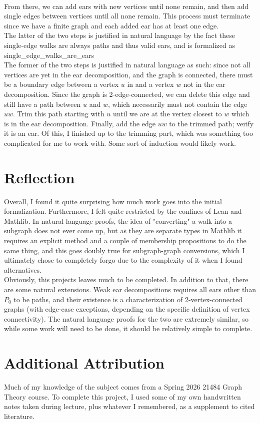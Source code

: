 \documentclass{article}
\begin{document}
\\ From there, we can add ears with new vertices until none remain, and then add single edges between vertices until all none remain. This process must terminate since we have a finite graph and each added ear has at least one edge.
\\ The latter of the two steps is justified in natural language by the fact these single-edge walks are always paths and thus valid ears, and is formalized as single\_edge\_walks\_are\_ears
\\ The former of the two steps is justified in natural language as such: since not all vertices are yet in the ear decomposition, and the graph is connected, there must be a boundary edge between a vertex $u$ in and a vertex $w$ not in the ear decomposition. Since the graph is 2-edge-connected, we can delete this edge and still have a path between $u$ and $w$, which necessarily must not contain the edge $uw$. Trim this path starting with $u$ until we are at the vertex closest to $w$ which is in the ear decomposition. Finally, add the edge $uw$ to the trimmed path; verify it is an ear. Of this, I finished up to the trimming part, which was something too complicated for me to work with. Some sort of induction would likely work.
\section{Reflection}
Overall, I found it quite surprising how much work goes into the initial formalization. Furthermore, I felt quite restricted by the confines of Lean and Mathlib. In natural language proofs, the idea of "converting" a walk into a subgraph does not ever come up, but as they are separate types in Mathlib it requires an explicit method and a couple of membership propositions to do the same thing, and this goes doubly true for subgraph-graph conversions, which I ultimately chose to completely forgo due to the complexity of it when I found alternatives.
\\ Obviously, this projects leaves much to be completed. In addition to that, there are some natural extensions. Weak ear decompositions requires all ears other than $P_0$ to be paths, and their existence is a characterization of 2-vertex-connected graphs (with edge-case exceptions, depending on the specific definition of vertex connectivity). The natural language proofs for the two are extremely similar, so while some work will need to be done, it should be relatively simple to complete.
\section{Additional Attribution}
Much of my knowledge of the subject comes from a Spring 2026 21484 Graph Theory course. To complete this project, I used some of my own handwritten notes taken during lecture, plus whatever I remembered, as a supplement to cited literature.
\newpage
\end{document}
